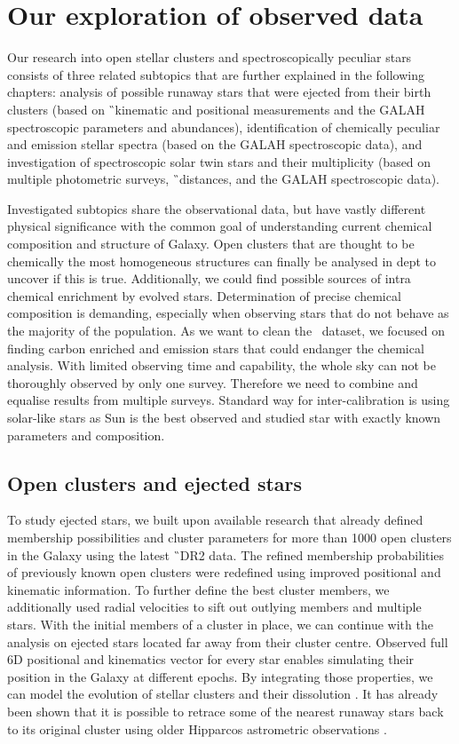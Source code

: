 \section{Our exploration of observed data}
Our research into open stellar clusters and spectroscopically peculiar stars consists of three related subtopics that are further explained in the following chapters: analysis of possible runaway stars that were ejected from their birth clusters (based on \G\ kinematic and positional measurements and the GALAH spectroscopic parameters and abundances), identification of chemically peculiar and emission stellar spectra (based on the GALAH spectroscopic data), and investigation of spectroscopic solar twin stars and their multiplicity (based on multiple photometric surveys, \G\ distances, and the GALAH spectroscopic data).

Investigated subtopics share the observational data, but have vastly different physical significance with the common goal of understanding current chemical composition and structure of Galaxy. Open clusters that are thought to be chemically the most homogeneous structures can finally be analysed in dept to uncover if this is true. Additionally, we could find possible sources of intra chemical enrichment by evolved stars. Determination of precise chemical composition is demanding, especially when observing stars that do not behave as the majority of the population. As we want to clean the \Gh\ dataset, we focused on finding carbon enriched and emission stars that could endanger the chemical analysis. With limited observing time and capability, the whole sky can not be thoroughly observed by only one survey. Therefore we need to combine and equalise results from multiple surveys. Standard way for inter-calibration is using solar-like stars as Sun is the best observed and studied star with exactly known parameters and composition.

\subsection{Open clusters and ejected stars}
To study ejected stars, we built upon available research that already defined membership possibilities and cluster parameters for more than 1000 open clusters in the Galaxy \cite{2018A&A...618A..93C} using the latest \G\ DR2 data. The refined membership probabilities of previously known open clusters \cite{2013A&A...558A..53K} were redefined using improved positional and kinematic information. To further define the best cluster members, we additionally used radial velocities to sift out outlying members and multiple stars. With the initial members of a cluster in place, we can continue with the analysis on ejected stars located far away from their cluster centre. Observed full 6D positional and kinematics vector for every star enables simulating their position in the Galaxy at different epochs. By integrating those properties, we can model the evolution of stellar clusters and their dissolution \cite{1998A&A...337..363P}. It has already been shown that it is possible to retrace some of the nearest runaway stars back to its original cluster using older Hipparcos astrometric observations \cite{2000ApJ...544L.133H}.

